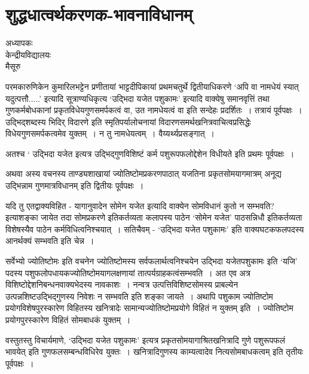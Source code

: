 {\fontsize{15}{17}\selectfont
\presetvalues
\chapter{शुद्धधात्वर्थकरणक-भावनाविधानम्}

\begin{center}
\smallskip

अध्यापकः\\
केन्द्रीयविद्यालयः\\ 
मैसूरु
\addrule
\end{center}

परमकारुणिकेन कुमारिलभट्टेन प्रणीतायां भाट्टदीपिकायां प्रथमचतुर्थे द्वितीयाधिकरणे ‘अपि वा नामधेयं स्यात् यदुत्पत्तौ.....’ इत्यादि सूत्राण्यधिकृत्य ‘उद्भिदा यजेत पशुकामः’ इत्यादि वाक्येषु समानवृत्तिं तथा गुणकर्मबोधकानां प्रकृतविधेयगुणसमर्पकत्वं वा, उत नामधेयत्वं वा इति सन्देहः प्रदर्शितः~। तत्रायं पूर्वपक्षः~। उद्भिद्शब्दस्य भिदिर् विदारणे इति स्मृतिपर्यालोचनायां विदारणसमर्थखनित्रवाचित्वप्रसिद्धेः विधेयगुणसमर्पकत्वमेव युक्तम्~। न तु नामधेयत्वम्~। वैय्यर्थ्यप्रसङ्गात्~। 

अतश्च  ‘ उद्भिदा यजेत इत्यत्र उद्भिद्गुणविशिष्टं कर्म पशुरूपफलोद्देशेन विधीयते इति प्रथमः पूर्वपक्षः~। 

अथवा अस्य वचनस्य ताण्ड्यशाखायां ज्योतिष्टोमप्रकरणपाठात् यजतिना प्रकृतसोमयागमात्रम् अनूद्य उद्भिन्नाम गुणमात्रविधानम् इति द्वितीयः पूर्वपक्षः~। 

यदि तु एतद्वाक्यविहित - यागानुवादेन सोमेन यजेत इत्यादि वाक्येन सोमविधानं कुतो न सम्भवति? इत्याशङ्का जायेत तदा सोमप्रकरणे इतिकर्तव्यता कलापस्य पाठेन ‘सोमेन यजेत’ पाठसन्निधौ इतिकर्तव्यता विशेषस्यैव पाठेन कर्मविधित्वनिश्चयात्~। सतिचैवम् - ‘उद्भिदा यजेत पशुकामः’ इति वाक्यघटकफलपदस्य आनर्थक्यं सम्भवति इति चेन्न~। 

सर्वेभ्यो ज्योतिष्टोमः इति वचनेन ज्योतिष्टोमस्य सर्वफलार्थत्वनिश्चयेन उद्भिदा यजेत\break पशुकामः इति ‘यजि’ पदस्य  पशुफलोपधायकज्योतिष्टोमयागलक्षणायां तात्पर्यग्राहकत्वं\break सम्भवति~। अत एव अत्र विशिष्टोद्देशनिबन्धनवाक्यभेदस्य नावकाशः~। नन्वत्र उत्पत्तिविशिष्ट\-सोमस्य प्राबल्येन उत्पन्नशिष्टउद्भिद्गुणस्य निवेशः न सम्भवति इति शङ्का जायते~। अथापि पशुकाम  ज्योतिष्टोम  प्रयोगविशेषपुरस्कारेण विहितस्य खनित्रादेः सामान्यज्योतिष्टोमप्रयोगे विहितं न युक्तम् इति~। ज्योतिष्टोम प्रयोगपुरस्कारेण विहितं सोमबाधकं युक्तम्~। 

वस्तुतस्तु विचार्यमाणे, ‘उद्भिदा यजेत पशुकामः’ इत्यत्र प्रकृतसोमयागाश्रितखनित्रादि गुणे पशुरूपफलं भावयेत् इति गुणफलसम्बन्धविधिरेव युक्तः~। खनित्रादिगुणस्य काम्यत्वादेव नित्यसोमबाधकत्वम् इति तृतीयः पूर्वपक्षः~। 

}
